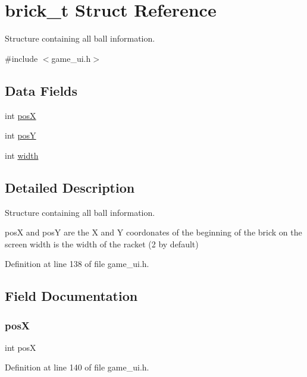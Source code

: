 \hypertarget{structbrick__t}{}\section{brick\+\_\+t Struct Reference}
\label{structbrick__t}


Structure containing all ball information.  




{\ttfamily \#include $<$game\+\_\+ui.\+h$>$}

\subsection*{Data Fields}
\begin{DoxyCompactItemize}
\item 
int \hyperlink{structbrick__t_ab34f89ef94db9dd6d3a04425dd6d9c9d}{posX}
\item 
int \hyperlink{structbrick__t_a65ab2de052c17234c8a1db3fd3b868a9}{posY}
\item 
int \hyperlink{structbrick__t_a2474a5474cbff19523a51eb1de01cda4}{width}
\end{DoxyCompactItemize}


\subsection{Detailed Description}
Structure containing all ball information. 

posX and posY are the X and Y coordonates of the beginning of the brick on the screen width is the width of the racket (2 by default) 

Definition at line 138 of file game\+\_\+ui.\+h.



\subsection{Field Documentation}
\mbox{\label{structbrick__t_ab34f89ef94db9dd6d3a04425dd6d9c9d}} 
\subsubsection{\texorpdfstring{posX}{posX}}
{\footnotesize\ttfamily int posX}



Definition at line 140 of file game\+\_\+ui.\+h.

